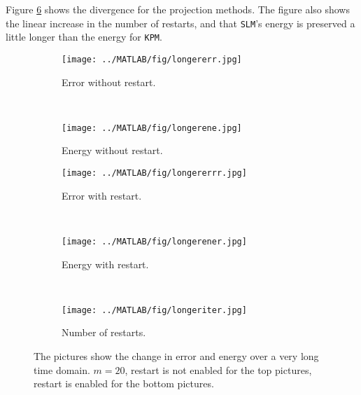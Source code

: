 \noindent Figure \ref{fig:vSLMenergyerror0} shows the divergence for the projection methods. The figure also shows the linear increase in the number of restarts, and that \texttt{SLM}'s energy is preserved a little longer than the energy for \texttt{KPM}.

\begin{figure}[H]
        \centering
        \begin{subfigure}[b]{0.3\textwidth}
                \texttt{[image: ../MATLAB/fig/longererr.jpg]}
                \caption{ Error without restart. }
                \label{fig:longererr}
        \end{subfigure}
        ~
        \begin{subfigure}[b]{0.3\textwidth}
                \texttt{[image: ../MATLAB/fig/longerene.jpg]}
                \caption{ Energy without restart. }
                \label{fig:longerene}
        \end{subfigure}

        \begin{subfigure}[b]{0.3\textwidth}
                \texttt{[image: ../MATLAB/fig/longererrr.jpg]}
                \caption{ Error with restart. }
                \label{fig:longererrr}
        \end{subfigure}
        ~
        \begin{subfigure}[b]{0.3\textwidth}
                \texttt{[image: ../MATLAB/fig/longerener.jpg]}
                \caption{ Energy with restart. }
                \label{fig:longerener}
        \end{subfigure}
     	~
        \begin{subfigure}[b]{0.3\textwidth}
                \texttt{[image: ../MATLAB/fig/longeriter.jpg]}
                \caption{ Number of restarts. }
                \label{fig:longeriter}
        \end{subfigure}        
        
        \caption{ The pictures show the change in error and energy over a very long time domain. $m = 20$, restart is not enabled for the top pictures, restart is enabled for the bottom pictures. }
        \label{fig:vSLMenergyerror0}
\end{figure}
